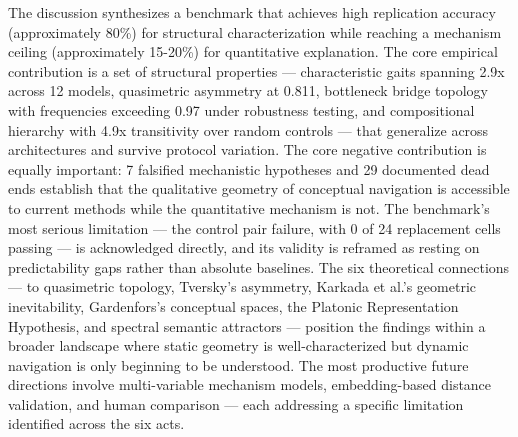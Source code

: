 The discussion synthesizes a benchmark that achieves high replication accuracy (approximately 80\%) for structural characterization while reaching a mechanism ceiling (approximately 15-20\%) for quantitative explanation. The core empirical contribution is a set of structural properties --- characteristic gaits spanning 2.9x across 12 models, quasimetric asymmetry at 0.811, bottleneck bridge topology with frequencies exceeding 0.97 under robustness testing, and compositional hierarchy with 4.9x transitivity over random controls --- that generalize across architectures and survive protocol variation. The core negative contribution is equally important: 7 falsified mechanistic hypotheses and 29 documented dead ends establish that the qualitative geometry of conceptual navigation is accessible to current methods while the quantitative mechanism is not. The benchmark's most serious limitation --- the control pair failure, with 0 of 24 replacement cells passing --- is acknowledged directly, and its validity is reframed as resting on predictability gaps rather than absolute baselines. The six theoretical connections --- to quasimetric topology, Tversky's asymmetry, Karkada et al.'s geometric inevitability, Gardenfors's conceptual spaces, the Platonic Representation Hypothesis, and spectral semantic attractors --- position the findings within a broader landscape where static geometry is well-characterized but dynamic navigation is only beginning to be understood. The most productive future directions involve multi-variable mechanism models, embedding-based distance validation, and human comparison --- each addressing a specific limitation identified across the six acts.

